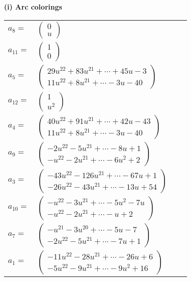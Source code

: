 \documentclass[1p]{elsarticle_modified}
\theoremstyle{definition}
\begin{document}
\flushleft \textbf{(i) Arc colorings}\\
\begin{tabular}{m{7pt} m{180pt} m{7pt} m{180pt} }
\flushright $a_{8}=$&$\begin{pmatrix}0\\u\end{pmatrix}$ \\
\flushright $a_{11}=$&$\begin{pmatrix}1\\0\end{pmatrix}$ \\
\flushright $a_{5}=$&$\begin{pmatrix}29 u^{22}+83 u^{21}+\cdots+45 u-3\\11 u^{22}+8 u^{21}+\cdots-3 u-40\end{pmatrix}$ \\
\flushright $a_{12}=$&$\begin{pmatrix}1\\u^2\end{pmatrix}$ \\
\flushright $a_{4}=$&$\begin{pmatrix}40 u^{22}+91 u^{21}+\cdots+42 u-43\\11 u^{22}+8 u^{21}+\cdots-3 u-40\end{pmatrix}$ \\
\flushright $a_{9}=$&$\begin{pmatrix}-2 u^{22}-5 u^{21}+\cdots-8 u+1\\- u^{22}-2 u^{21}+\cdots-6 u^2+2\end{pmatrix}$ \\
\flushright $a_{3}=$&$\begin{pmatrix}-43 u^{22}-126 u^{21}+\cdots-67 u+1\\-26 u^{22}-43 u^{21}+\cdots-13 u+54\end{pmatrix}$ \\
\flushright $a_{10}=$&$\begin{pmatrix}- u^{22}-3 u^{21}+\cdots-5 u^2-7 u\\- u^{22}-2 u^{21}+\cdots- u+2\end{pmatrix}$ \\
\flushright $a_{7}=$&$\begin{pmatrix}- u^{21}-3 u^{20}+\cdots-5 u-7\\-2 u^{22}-5 u^{21}+\cdots-7 u+1\end{pmatrix}$ \\
\flushright $a_{1}=$&$\begin{pmatrix}-11 u^{22}-28 u^{21}+\cdots-26 u+6\\-5 u^{22}-9 u^{21}+\cdots-9 u^2+16\end{pmatrix}$ \\

\end{tabular}
\end{document}
